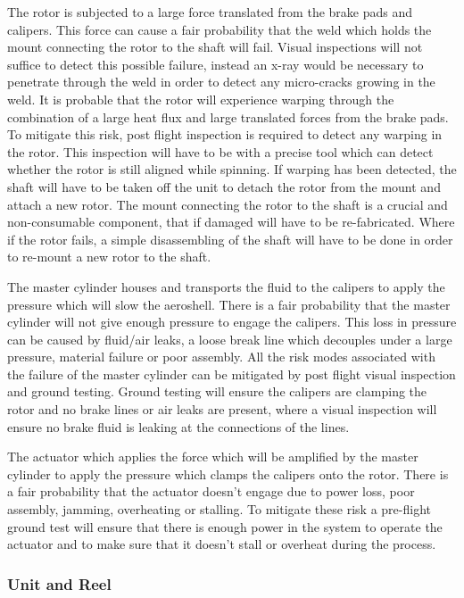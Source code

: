 The rotor is subjected to a large force translated from the brake pads and calipers. This force can cause a fair probability that the weld which holds the mount connecting the rotor to the shaft will fail. Visual inspections will not suffice to detect this possible failure, instead an x-ray would be necessary to penetrate through the weld in order to detect any micro-cracks growing in the weld.  It is probable that the rotor will experience warping through the combination of a large heat flux and large translated forces from the brake pads. To mitigate this risk, post flight inspection is required to detect any warping in the rotor. This inspection will have to be with a precise tool which can detect whether the rotor is still aligned while spinning. If warping has been detected, the shaft will have to be taken off the unit to detach the rotor from the mount and attach a new rotor. The mount connecting the rotor to the shaft is a crucial and non-consumable component, that if damaged will have to be re-fabricated. Where if the rotor fails, a simple disassembling of the shaft will have to be done in order to re-mount a new rotor to the shaft. 

The master cylinder houses and transports the fluid to the calipers to apply the pressure which will slow the aeroshell. There is a fair probability that the master cylinder will not give enough pressure to engage the calipers. This loss in pressure can be caused by fluid/air leaks, a loose break line which decouples under a large pressure, material failure or poor assembly. All the risk modes associated with the failure of the master cylinder can be mitigated by post flight visual inspection and ground testing. Ground testing will ensure the calipers are clamping the rotor and no brake lines or air leaks are present, where a visual inspection will ensure no brake fluid is leaking at the connections of the lines. 

The actuator which applies the force which will be amplified by the master cylinder to apply the pressure which clamps the calipers onto the rotor. There is a fair probability that the actuator doesn't engage due to power loss, poor assembly, jamming, overheating or stalling. To mitigate these risk a pre-flight ground test will ensure that there is enough power in the system to operate the actuator and to make sure that it doesn't stall or overheat during the process. 


\subsubsection{Unit and Reel}

